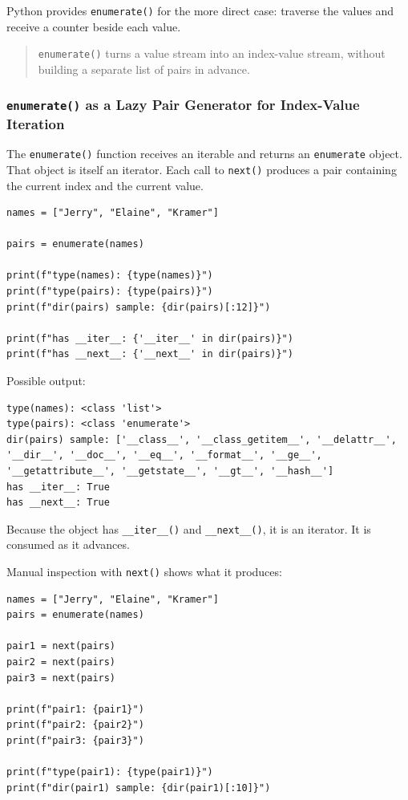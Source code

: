 \documentclass[a4paper,twoside]{report}
\begin{document}
Python provides \texttt{enumerate()} for the more direct case: traverse the values and receive a counter beside each value.

\begin{quote}
\texttt{enumerate()} turns a value stream into an index-value stream, without building a separate list of pairs in advance.
\end{quote}

\subsubsection{\texttt{enumerate()} as a Lazy Pair Generator for Index-Value Iteration}

The \texttt{enumerate()} function receives an iterable and returns an \texttt{enumerate} object. That object is itself an iterator. Each call to \texttt{next()} produces a pair containing the current index and the current value.

\begin{verbatim}
names = ["Jerry", "Elaine", "Kramer"]

pairs = enumerate(names)

print(f"type(names): {type(names)}")
print(f"type(pairs): {type(pairs)}")
print(f"dir(pairs) sample: {dir(pairs)[:12]}")

print(f"has __iter__: {'__iter__' in dir(pairs)}")
print(f"has __next__: {'__next__' in dir(pairs)}")
\end{verbatim}

Possible output:

\begin{verbatim}
type(names): <class 'list'>
type(pairs): <class 'enumerate'>
dir(pairs) sample: ['__class__', '__class_getitem__', '__delattr__',
'__dir__', '__doc__', '__eq__', '__format__', '__ge__',
'__getattribute__', '__getstate__', '__gt__', '__hash__']
has __iter__: True
has __next__: True
\end{verbatim}

Because the object has \texttt{\_\_iter\_\_()} and \texttt{\_\_next\_\_()}, it is an iterator. It is consumed as it advances.

Manual inspection with \texttt{next()} shows what it produces:

\begin{verbatim}
names = ["Jerry", "Elaine", "Kramer"]
pairs = enumerate(names)

pair1 = next(pairs)
pair2 = next(pairs)
pair3 = next(pairs)

print(f"pair1: {pair1}")
print(f"pair2: {pair2}")
print(f"pair3: {pair3}")

print(f"type(pair1): {type(pair1)}")
print(f"dir(pair1) sample: {dir(pair1)[:10]}")
\end{verbatim}
\end{document}
